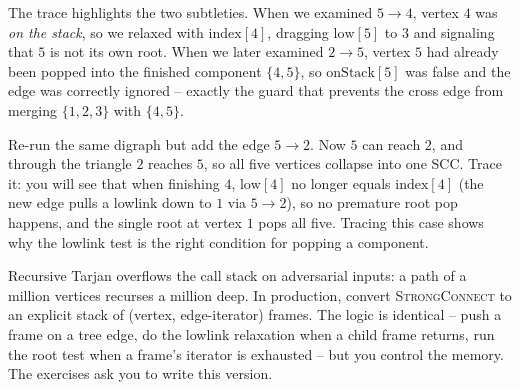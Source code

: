 \begin{center}
\end{center}

The trace highlights the two subtleties. When we examined $5\to4$, vertex $4$ was \emph{on the stack}, so we relaxed with $\mathrm{index}[4]$, dragging $\mathrm{low}[5]$ to $3$ and signaling that $5$ is not its own root. When we later examined $2\to5$, vertex $5$ had already been popped into the finished component $\{4,5\}$, so $\mathrm{onStack}[5]$ was false and the edge was correctly ignored -- exactly the guard that prevents the cross edge from merging $\{1,2,3\}$ with $\{4,5\}$.

\begin{labbox}
Re-run the same digraph but add the edge $5\to 2$. Now $5$ can reach $2$, and through the triangle $2$ reaches $5$, so all five vertices collapse into one SCC. Trace it: you will see that when finishing $4$, $\mathrm{low}[4]$ no longer equals $\mathrm{index}[4]$ (the new edge pulls a lowlink down to $1$ via $5\to 2$), so no premature root pop happens, and the single root at vertex $1$ pops all five. Tracing this case shows why the lowlink test is the right condition for popping a component.
\end{labbox}

\begin{trapbox}
Recursive Tarjan overflows the call stack on adversarial inputs: a path of a million vertices recurses a million deep. In production, convert \textsc{StrongConnect} to an explicit stack of (vertex, edge-iterator) frames. The logic is identical -- push a frame on a tree edge, do the lowlink relaxation when a child frame returns, run the root test when a frame's iterator is exhausted -- but you control the memory. The exercises ask you to write this version.
\end{trapbox}

